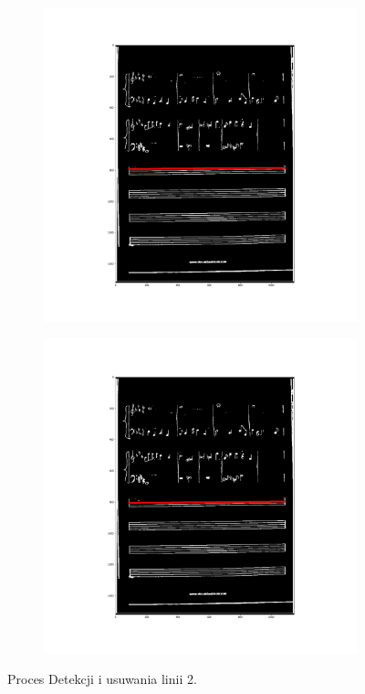 \documentclass[12pt]{article}
\begin{document}
\begin{figure}[h!]
\begin{subfigure}[b]{0.32\linewidth}
		\end{subfigure}
		\begin{subfigure}[b]{0.32\linewidth}
			\includegraphics[width=\linewidth]{zdj/BFS22.png}
		\end{subfigure}
		\begin{subfigure}[b]{0.32\linewidth}
			\includegraphics[width=\linewidth]{zdj/BFS23.png}
		\end{subfigure}
		\caption{Proces Detekcji i usuwania linii 2.}
		\label{fig:bfs1}
	\end{figure}
\end{document}

